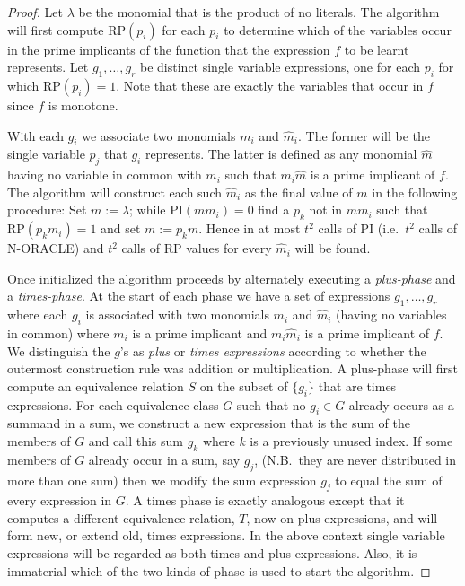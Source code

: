 \begin{proof}
Let $\lambda$ be the monomial that is the product of no literals. The algorithm will first compute $\text{RP}(p_i)$ for each $p_i$ to determine which of the variables occur in the prime implicants of the function that the expression $f$ to be learnt represents. Let $g_1, \ldots, g_r$ be distinct single variable expressions, one for each $p_i$ for which $\text{RP}(p_i) = 1$. Note that these are exactly the variables that occur in $f$ since $f$ is monotone.

With each $g_i$ we associate two monomials $m_i$ and $\hat{m}_i$. The former will be the single variable $p_j$ that $g_i$ represents. The latter is defined as any monomial $\hat{m}$ having no variable in common with $m_i$ such that $m_i \hat{m}$ is a prime implicant of $f$. The algorithm will construct each such $\hat{m}_i$ as the final value of $m$ in the following procedure: Set $m := \lambda$; while $\text{PI}(mm_i) = 0$ find a $p_k$ not in $mm_i$ such that $\text{RP}(p_k m_i) = 1$ and set $m := p_k m$. Hence in at most $t^2$ calls of PI (i.e.\ $t^2$ calls of N-ORACLE) and $t^2$ calls of RP values for every $\hat{m}_i$ will be found.

Once initialized the algorithm proceeds by alternately executing a \emph{plus-phase} and a \emph{times-phase}. At the start of each phase we have a set of expressions $g_1, \ldots, g_r$ where each $g_i$ is associated with two monomials $m_i$ and $\hat{m}_i$ (having no variables in common) where $m_i$ is a prime implicant and $m_i \hat{m}_i$ is a prime implicant of $f$. We distinguish the $g$'s as \emph{plus} or \emph{times expressions} according to whether the outermost construction rule was addition or multiplication. A plus-phase will first compute an equivalence relation $S$ on the subset of $\{g_i\}$ that are times expressions. For each equivalence class $G$ such that no $g_i \in G$ already occurs as a summand in a sum, we construct a new expression that is the sum of the members of $G$ and call this sum $g_k$ where $k$ is a previously unused index. If some members of $G$ already occur in a sum, say $g_j$, (N.B.\ they are never distributed in more than one sum) then we modify the sum expression $g_j$ to equal the sum of every expression in $G$. A times phase is exactly analogous except that it computes a different equivalence relation, $T$, now on plus expressions, and will form new, or extend old, times expressions. In the above context single variable expressions will be regarded as both times and plus expressions. Also, it is immaterial which of the two kinds of phase is used to start the algorithm.


\end{proof}
